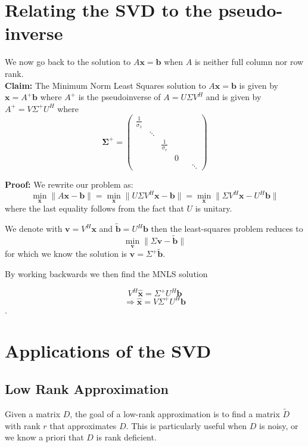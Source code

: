 \section{Relating the SVD to the pseudo-inverse}

We now go back to the solution to \( A\mathbf{x} = \mathbf{b} \) when \( A \) is neither full column nor row rank.\\

\textbf{Claim:} The Minimum Norm Least Squares solution to \( A\mathbf{x} = \mathbf{b} \) is given by \( \mathbf{x} = A^+\mathbf{b} \) where \( A^+ \) is the pseudoinverse of \( A = U\Sigma V^H \) and is given by \( A^+ = V\Sigma^+U^H \) where\\

\[\mathbf{\Sigma}^{+}=\begin{pmatrix}\frac{1}{\sigma_{1}}&&&&&\\&\ddots&&&&\\&&\frac{1}{\sigma_{r}}&&&\\&&&0&&\\&&&&&\ddots\end{pmatrix}\]

\textbf{Proof:}
We rewrite our problem as:
\[
\min_{\mathbf{x}} \|A\mathbf{x} - \mathbf{b}\| = \min_{\mathbf{x}} \|U\Sigma V^H\mathbf{x} - \mathbf{b}\| = \min_{\mathbf{x}} \| \Sigma V^H\mathbf{x} - U^H\mathbf{b} \|
\]
where the last equality follows from the fact that \( U \) is unitary.

We denote with \( \mathbf{v} = V^H\mathbf{x} \) and \( \mathbf{\tilde{b}} = U^H\mathbf{b} \) then the least-squares problem reduces to 
\[
\min_{\mathbf{v}} \|\Sigma\mathbf{v} - \mathbf{\tilde{b}}\|
\]
for which we know the solution is \( \mathbf{v} = \Sigma^+\mathbf{\tilde{b}} \).

By working backwards we then find the MNLS solution

\[ V^H\mathbf{\hat{x}} = \Sigma^+U^H\mathbf{b}\]\[\Rightarrow \mathbf{\hat{x}} = V\Sigma^+U^H\mathbf{b} \].

\section{Applications of the SVD}
\subsection{Low Rank Approximation}

Given a matrix \( D \), the goal of a low-rank approximation is to find a matrix \( \tilde{D} \) with rank \( r \) that approximates \( D \). This is particularly useful when \( D \) is noisy, or we know a priori that \( D \) is rank deficient.

